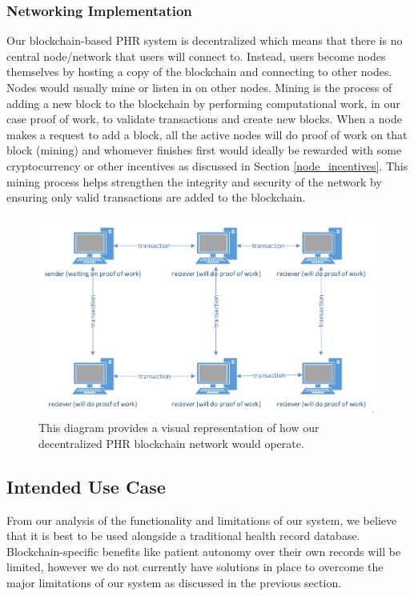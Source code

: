 \documentclass{article}
\begin{document}
\subsubsection{Networking Implementation}
\label{improvements:networking}
Our blockchain-based PHR system is decentralized which means that there is no central node/network that users will connect to. Instead, users become nodes themselves by hosting a copy of the blockchain and connecting to other nodes. Nodes would usually mine or listen in on other nodes. Mining is the process of adding a new block to the blockchain by performing computational work, in our case proof of work, to validate transactions and create new blocks. When a node makes a request to add a block, all the active nodes will do proof of work on that block (mining) and whomever finishes first would ideally be rewarded with some cryptocurrency or other incentives as discussed in Section \ref{node_incentives}. This mining process helps strengthen the integrity and security of the network by ensuring only valid transactions are added to the blockchain.


\begin{figure}[h]
\centering
\includegraphics[width=\textwidth]{images/network.png}
\caption{This diagram provides a visual representation of how our decentralized PHR blockchain network would operate.}
\label{fig:network_diagram}
\end{figure}


\subsection{Intended Use Case}
From our analysis of the functionality and limitations of our system, we believe that it is best to be used alongside a traditional health record database. Blockchain-specific benefits like patient autonomy over their own records will be limited, however we do not currently have solutions in place to overcome the major limitations of our system as discussed in the previous section.
\end{document}
